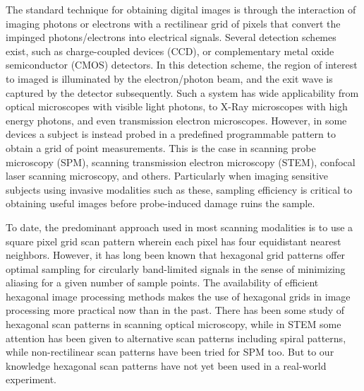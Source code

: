 \documentclass[aip, amsmath, amssymb, nobibnotes, nofootinbib, citeautoscript, reprint, superscriptaddress]{revtex4-1}
\begin{document}
    The standard technique for obtaining digital images is through the interaction of imaging photons or electrons with a rectilinear grid of pixels that convert the impinged photons/electrons into electrical signals.
    Several detection schemes exist, such as charge-coupled devices (CCD), or complementary metal oxide semiconductor (CMOS) detectors\cite{electron_detectors_review, ccd_cmos_review}.
    In this detection scheme, the region of interest to imaged is illuminated by the electron/photon beam, and the exit wave is captured by the detector subsequently.
    Such a system has wide applicability from optical microscopes with visible light photons, to X-Ray microscopes with high energy photons, and even transmission electron microscopes.
    However, in some devices a subject is instead probed in a predefined programmable pattern to obtain a grid of point measurements.
    This is the case in scanning probe microscopy (SPM), scanning transmission electron microscopy (STEM), confocal laser scanning microscopy, and others.
    Particularly when imaging sensitive subjects using invasive modalities such as these, sampling efficiency is critical to obtaining useful images before probe-induced damage ruins the sample.


    To date, the predominant approach used in most scanning modalities is to use a square pixel grid scan pattern wherein each pixel has four equidistant nearest neighbors.
    However, it has long been known that hexagonal grid patterns offer optimal sampling for circularly band-limited signals in the sense of minimizing aliasing for a given number of sample points\cite{petersen1962}.
    The availability of efficient hexagonal image processing methods makes the use of hexagonal grids in image processing more practical now than in the past\cite{hex_fft, middleton2006hexagonal}.
    There has been some study of hexagonal scan patterns in scanning optical microscopy\cite{heintzmann2007}, while in STEM some attention has been given to alternative scan patterns including spiral patterns\cite{spiral_scans}, while non-rectilinear scan patterns have been tried for SPM too\cite{non_gridded_spm}. 
    But to our knowledge hexagonal scan patterns have not yet been used in a real-world experiment. 
\end{document}
